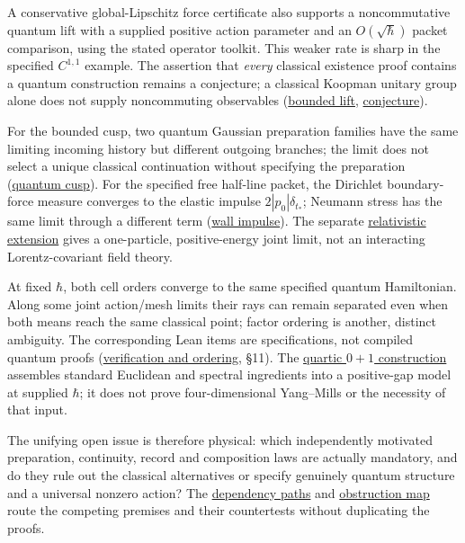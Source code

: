 \documentclass[11pt,a4paper]{article}
\begin{document}
A conservative global-Lipschitz force certificate also supports a
noncommutative quantum lift with a supplied positive action parameter
and an \(O(\sqrt\hbar)\) packet comparison, using the stated operator
toolkit. This weaker rate is sharp in the specified \(C^{1,1}\) example.
The assertion that \emph{every} classical existence proof contains a
quantum construction remains a conjecture; a classical Koopman unitary
group alone does not supply noncommuting observables
(\href{lipschitz-certificate-quantum-lift.md}{bounded lift},
\href{classical-quantum-existence-conjecture.md}{conjecture}).

For the bounded cusp, two quantum Gaussian preparation families have the
same limiting incoming history but different outgoing branches; the
limit does not select a unique classical continuation without specifying
the preparation (\href{cusp-quantum-preparation-selection.md}{quantum
cusp}). For the specified free half-line packet, the Dirichlet
boundary-force measure converges to the elastic impulse
\(2|p_0|\delta_{t_*}\); Neumann stress has the same limit through a
different term (\href{dirichlet-wall-impulse.md}{wall impulse}). The
separate \href{relativistic-dispersion-blocks.md}{relativistic
extension} gives a one-particle, positive-energy joint limit, not an
interacting Lorentz-covariant field theory.

At fixed \(\hbar\), both cell orders converge to the same specified
quantum Hamiltonian. Along some joint action/mesh limits their rays can
remain separated even when both means reach the same classical point;
factor ordering is another, distinct ambiguity. The corresponding Lean
items are specifications, not compiled quantum proofs
(\href{lean-verification-quantum-newton.md}{verification and ordering},
§11). The \href{constructive-qft-one-time.md}{quartic \(0+1\)
construction} assembles standard Euclidean and spectral ingredients into
a positive-gap model at supplied \(\hbar\); it does not prove
four-dimensional Yang--Mills or the necessity of that input.

The unifying open issue is therefore physical: which independently
motivated preparation, continuity, record and composition laws are
actually mandatory, and do they rule out the classical alternatives or
specify genuinely quantum structure and a universal nonzero action? The
\href{../research/dependencies.md}{dependency paths} and
\href{../research/obstructions.md}{obstruction map} route the competing
premises and their countertests without duplicating the proofs.
\end{document}
